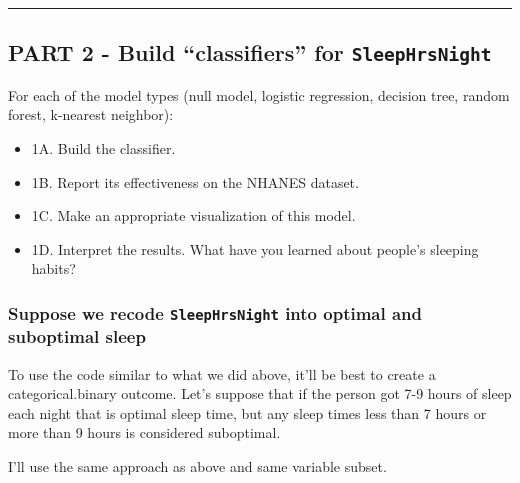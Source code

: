 \documentclass[]{article}
\newenvironment{Shaded}{\begin{snugshade}}{\end{snugshade}}
\newcommand{\KeywordTok}[1]{\textcolor[rgb]{0.13,0.29,0.53}{\textbf{{#1}}}}
\newcommand{\StringTok}[1]{\textcolor[rgb]{0.31,0.60,0.02}{{#1}}}
\newcommand{\CommentTok}[1]{\textcolor[rgb]{0.56,0.35,0.01}{\textit{{#1}}}}
\newcommand{\NormalTok}[1]{{#1}}
\providecommand{\tightlist}{%
  \setlength{\itemsep}{0pt}\setlength{\parskip}{0pt}}
\begin{document}
\begin{center}\rule{0.5\linewidth}{\linethickness}\end{center}

\subsection{\texorpdfstring{PART 2 - Build ``classifiers'' for
\texttt{SleepHrsNight}}{PART 2 - Build classifiers for SleepHrsNight}}\label{part-2---build-classifiers-for-sleephrsnight}

For each of the model types (null model, logistic regression, decision
tree, random forest, k-nearest neighbor):

\begin{itemize}
\tightlist
\item
  1A. Build the classifier.
\item
  1B. Report its effectiveness on the NHANES dataset.
\item
  1C. Make an appropriate visualization of this model.
\item
  1D. Interpret the results. What have you learned about people's
  sleeping habits?
\end{itemize}

\subsubsection{\texorpdfstring{Suppose we recode \texttt{SleepHrsNight}
into optimal and suboptimal
sleep}{Suppose we recode SleepHrsNight into optimal and suboptimal sleep}}\label{suppose-we-recode-sleephrsnight-into-optimal-and-suboptimal-sleep}

To use the code similar to what we did above, it'll be best to create a
categorical.binary outcome. Let's suppose that if the person got 7-9
hours of sleep each night that is optimal sleep time, but any sleep
times less than 7 hours or more than 9 hours is considered suboptimal.

I'll use the same approach as above and same variable subset.

\begin{Shaded}
\end{Shaded}
\end{document}
